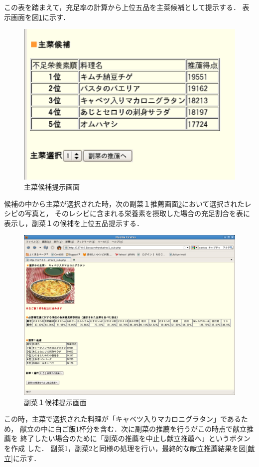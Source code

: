 \documentclass[11pt,titlepage,uplatex]{ujreport}
\begin{document}
この表を踏まえて，充足率の計算から上位五品を主菜候補として提示する．
表示画面を図\ref{主菜}に示す．
\begin{figure}[tbh]
  \centering
\includegraphics[scale=0.7]{main3-2.pdf}
\caption{主菜候補提示画面}
\label{主菜}
\end{figure}
\noindent
候補の中から主菜が選択された時，次の副菜１推薦画面\ref{副菜１}において選択されたレシピの写真と，
そのレシピに含まれる栄養素を摂取した場合の充足割合を表に表示し，副菜１の候補を上位五品提示する．
\begin{figure}[tbh]
  \centering
\includegraphics[scale=0.3]{sub1-2.pdf}
\caption{副菜１候補提示画面}
\label{副菜１}
\end{figure}
\noindent
この時，主菜で選択された料理が「キャベツ入りマカロニグラタン」であるため，
献立の中に白ご飯1杯分を含む．次に副菜の推薦を行うがこの時点で献立推薦を
終了したい場合のために「副菜の推薦を中止し献立推薦へ」というボタンを作成
した．
副菜1，副菜2と同様の処理を行い，最終的な献立推薦結果を図\ref{献立}に示す．
\end{document}
